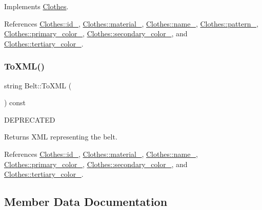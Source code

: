 Implements \mbox{\hyperlink{classClothes_a953d143394e9a2c007ab0c3a638973cf}{Clothes}}.



References \mbox{\hyperlink{classClothes_a8978d931db5ca47c3ccea30def4ae83e}{Clothes\+::id\+\_\+}}, \mbox{\hyperlink{classClothes_adbb9ed311f14ccbb1e4fe0e8378a95d4}{Clothes\+::material\+\_\+}}, \mbox{\hyperlink{classClothes_a7f2275aaae24224d60c48af922c31b65}{Clothes\+::name\+\_\+}}, \mbox{\hyperlink{classClothes_a1d40145a4eb6d28441f112f030ab5d35}{Clothes\+::pattern\+\_\+}}, \mbox{\hyperlink{classClothes_a7cb005bf6cbb7f4eaa40f1b31817559c}{Clothes\+::primary\+\_\+color\+\_\+}}, \mbox{\hyperlink{classClothes_ab8f55f67b956b25d71260cffcf273673}{Clothes\+::secondary\+\_\+color\+\_\+}}, and \mbox{\hyperlink{classClothes_a3c5f1e7ab531e3ba7a38b930da8078a0}{Clothes\+::tertiary\+\_\+color\+\_\+}}.

\mbox{\label{classBelt_a69b84739e63f35afa5dacf6f3ce0d731}} 
\subsubsection{\texorpdfstring{To\+X\+M\+L()}{ToXML()}}
{\footnotesize\ttfamily string Belt\+::\+To\+X\+ML (\begin{DoxyParamCaption}{ }\end{DoxyParamCaption}) const}

D\+E\+P\+R\+E\+C\+A\+T\+ED \begin{DoxyReturn}{Returns}
X\+ML representing the belt. 
\end{DoxyReturn}


References \mbox{\hyperlink{classClothes_a8978d931db5ca47c3ccea30def4ae83e}{Clothes\+::id\+\_\+}}, \mbox{\hyperlink{classClothes_adbb9ed311f14ccbb1e4fe0e8378a95d4}{Clothes\+::material\+\_\+}}, \mbox{\hyperlink{classClothes_a7f2275aaae24224d60c48af922c31b65}{Clothes\+::name\+\_\+}}, \mbox{\hyperlink{classClothes_a7cb005bf6cbb7f4eaa40f1b31817559c}{Clothes\+::primary\+\_\+color\+\_\+}}, \mbox{\hyperlink{classClothes_ab8f55f67b956b25d71260cffcf273673}{Clothes\+::secondary\+\_\+color\+\_\+}}, and \mbox{\hyperlink{classClothes_a3c5f1e7ab531e3ba7a38b930da8078a0}{Clothes\+::tertiary\+\_\+color\+\_\+}}.



\subsection{Member Data Documentation}
\mbox{\label{classClothes_ae2e5026257b3a2f2ddbf61757fd3b57b}} 
